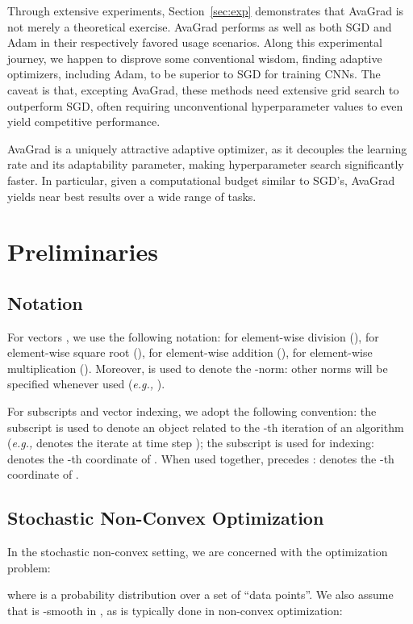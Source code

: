 \documentclass{article}
\newcommand{\eg}{\textit{e.g.,} }
\begin{document}
\pagebreak

Through extensive experiments, Section~\ref{sec:exp} demonstrates that AvaGrad
is not merely a theoretical exercise.  AvaGrad performs as well as both SGD and
Adam in their respectively favored usage scenarios.  Along this experimental
journey, we happen to disprove some conventional wisdom, finding adaptive
optimizers, including Adam, to be superior to SGD for training CNNs.  The
caveat is that, excepting AvaGrad, these methods need extensive grid search to outperform SGD, often requiring unconventional hyperparameter values to even yield competitive performance.

AvaGrad is a uniquely attractive adaptive optimizer, as it decouples the learning rate and its adaptability parameter, making hyperparameter search significantly faster. In particular, given a computational budget similar to SGD's, AvaGrad yields near best results over a wide range of tasks. 
 \section{Preliminaries}
\label{sec:prelim}

\subsection{Notation}

For vectors , we use the
following notation:
    for element-wise division
      (),
    for element-wise square root
      (),
    for element-wise addition
      (),
    for element-wise multiplication
      ().
Moreover,  is used to denote the -norm: other norms will be
specified whenever used (\eg ).

For subscripts and vector indexing, we adopt the following convention: the
subscript  is used to denote an object related to the -th iteration of an
algorithm (\eg  denotes the iterate at time step ); the
subscript  is used for indexing:  denotes the -th coordinate
of .  When used together,  precedes : 
denotes the -th coordinate of .

\subsection{Stochastic Non-Convex Optimization}

In the stochastic non-convex setting, we are concerned with the optimization
problem:

where  is a probability distribution over a set  of
``data points''.  We also assume that  is -smooth in , as is
typically done in non-convex optimization:
\end{document}
